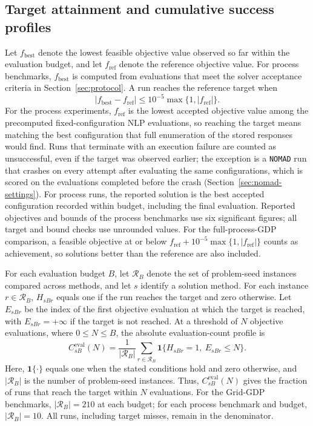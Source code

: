 \documentclass{article}
\begin{document}
\subsection{Target attainment and cumulative success profiles}
\label{sec:metrics}
Let \(f_{\mathrm{best}}\) denote the lowest feasible objective value observed so far within the evaluation budget, and let \(f_{\mathrm{ref}}\) denote the reference objective value.
For process benchmarks, \(f_{\mathrm{best}}\) is computed from evaluations that meet the solver acceptance criteria in Section~\ref{sec:protocol}.
A run reaches the reference target when
\begin{equation}\label{eqn:target}
 |f_{\mathrm{best}}-f_{\mathrm{ref}}|
 \leq 10^{-5}\max\{1,|f_{\mathrm{ref}}|\}.
\end{equation}
For the process experiments, \(f_{\mathrm{ref}}\) is the lowest accepted objective value among the precomputed fixed-configuration NLP evaluations, so reaching the target means matching the best configuration that full enumeration of the stored responses would find.
Runs that terminate with an execution failure are counted as unsuccessful, even if the target was observed earlier; the exception is a \texttt{NOMAD} run that crashes on every attempt after evaluating the same configurations, which is scored on the evaluations completed before the crash (Section~\ref{sec:nomad-settings}).
For process runs, the reported solution is the best accepted configuration recorded within budget, including the final evaluation.
Reported objectives and bounds of the process benchmarks use six significant figures; all target and bound checks use unrounded values.
For the full-process-GDP comparison, a feasible objective at or below \(f_{\mathrm{ref}}+10^{-5}\max\{1,|f_{\mathrm{ref}}|\}\) counts as achievement, so solutions better than the reference are also included.

For each evaluation budget \(B\), let \(\mathcal R_B\) denote the set of problem-seed instances compared across methods, and let \(s\) identify a solution method.
For each instance \(r\in\mathcal R_B\), \(H_{sBr}\) equals one if the run reaches the target and zero otherwise.
Let \(E_{sBr}\) be the index of the first objective evaluation at which the target is reached, with \(E_{sBr}=+\infty\) if the target is not reached.
At a threshold of \(N\) objective evaluations, where \(0\leq N\leq B\), the absolute evaluation-count profile is
\begin{equation}\label{eqn:absolute-evaluations}
 C^{\mathrm{eval}}_{sB}(N)
 =\frac{1}{|\mathcal R_B|}\sum_{r\in\mathcal R_B}
 \mathbf{1}\{H_{sBr}=1,\ E_{sBr}\leq N\}.
\end{equation}
Here, \(\mathbf{1}\{\cdot\}\) equals one when the stated conditions hold and zero otherwise, and \(|\mathcal R_B|\) is the number of problem-seed instances.
Thus, \(C^{\mathrm{eval}}_{sB}(N)\) gives the fraction of runs that reach the target within \(N\) evaluations.
For the Grid-GDP benchmarks, \(|\mathcal R_B|=210\) at each budget; for each process benchmark and budget, \(|\mathcal R_B|=10\).
All runs, including target misses, remain in the denominator.
\end{document}
